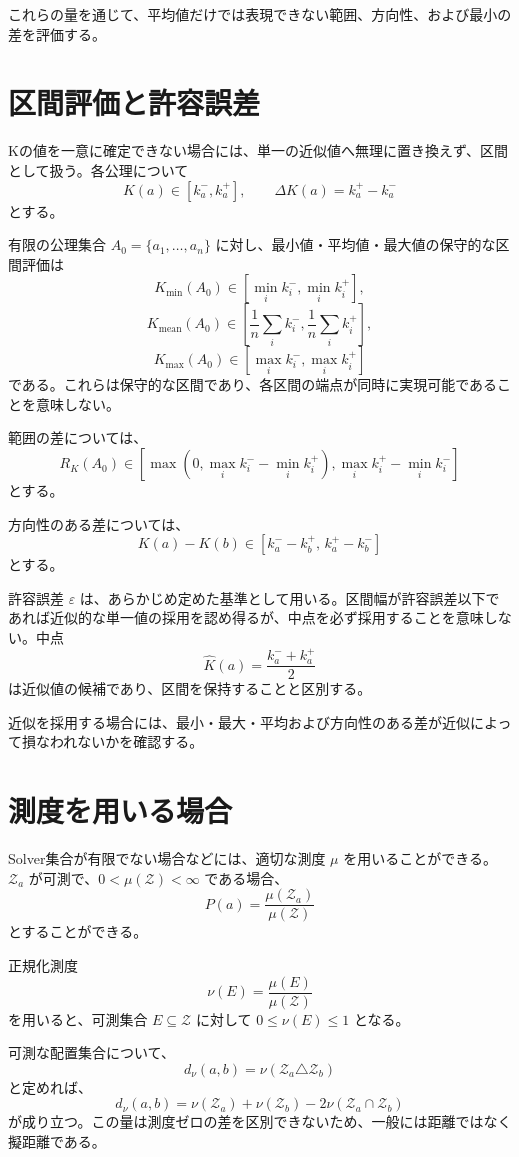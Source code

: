 \documentclass[a4paper,12pt]{article}
\begin{document}
これらの量を通じて、平均値だけでは表現できない範囲、方向性、および最小の差を評価する。

\section{区間評価と許容誤差}

Kの値を一意に確定できない場合には、単一の近似値へ無理に置き換えず、区間として扱う。各公理について
\[
K(a)\in[k_a^-,k_a^+],
\qquad
\Delta K(a)=k_a^+-k_a^-
\]
とする。

有限の公理集合 $A_0=\{a_1,\ldots,a_n\}$ に対し、最小値・平均値・最大値の保守的な区間評価は
\[
K_{\min}(A_0)
\in
\left[\min_i k_i^-,\min_i k_i^+\right],
\]
\[
K_{\mathrm{mean}}(A_0)
\in
\left[
\frac1n\sum_i k_i^-,
\frac1n\sum_i k_i^+
\right],
\]
\[
K_{\max}(A_0)
\in
\left[\max_i k_i^-,\max_i k_i^+\right]
\]
である。これらは保守的な区間であり、各区間の端点が同時に実現可能であることを意味しない。

範囲の差については、
\[
R_K(A_0)\in
\left[
\max\left(0,\max_i k_i^--\min_i k_i^+\right),
\max_i k_i^+-\min_i k_i^-
\right]
\]
とする。

方向性のある差については、
\[
K(a)-K(b)
\in[k_a^--k_b^+,\,k_a^+-k_b^-]
\]
とする。

許容誤差 $\varepsilon$ は、あらかじめ定めた基準として用いる。区間幅が許容誤差以下であれば近似的な単一値の採用を認め得るが、中点を必ず採用することを意味しない。中点
\[
\widehat K(a)=\frac{k_a^-+k_a^+}{2}
\]
は近似値の候補であり、区間を保持することと区別する。

近似を採用する場合には、最小・最大・平均および方向性のある差が近似によって損なわれないかを確認する。

\section{測度を用いる場合}

Solver集合が有限でない場合などには、適切な測度 $\mu$ を用いることができる。$\mathcal{Z}_a$ が可測で、$0<\mu(\mathcal{Z})<\infty$ である場合、
\[
P(a)=\frac{\mu(\mathcal{Z}_a)}{\mu(\mathcal{Z})}
\]
とすることができる。

正規化測度
\[
\nu(E)=\frac{\mu(E)}{\mu(\mathcal{Z})}
\]
を用いると、可測集合 $E\subseteq\mathcal{Z}$ に対して $0\le\nu(E)\le1$ となる。

可測な配置集合について、
\[
d_\nu(a,b)=\nu(\mathcal{Z}_a\triangle\mathcal{Z}_b)
\]
と定めれば、
\[
d_\nu(a,b)
=
\nu(\mathcal{Z}_a)+\nu(\mathcal{Z}_b)
-2\nu(\mathcal{Z}_a\cap\mathcal{Z}_b)
\]
が成り立つ。この量は測度ゼロの差を区別できないため、一般には距離ではなく擬距離である。
\end{document}
